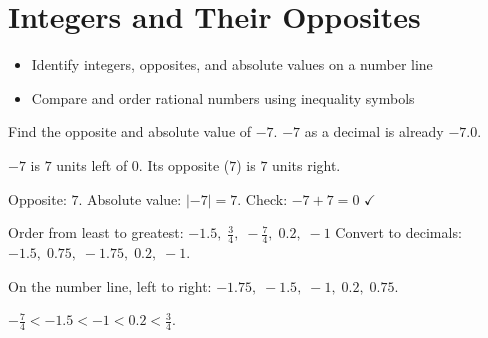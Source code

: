 \section{Integers and Their Opposites}

\begin{stepGoal}
\begin{itemize}
    \item Identify integers, opposites, and absolute values on a number line
    \item Compare and order rational numbers using inequality symbols
\end{itemize}
\end{stepGoal}

\begin{stepVocabBox}
\end{stepVocabBox}

\begin{stepsCard}
\end{stepsCard}

\begin{stepExample}{Find the opposite and absolute value of $-7$.}
     $-7$ as a decimal is already $-7.0$.

     $-7$ is $7$ units left of $0$. Its opposite ($7$) is $7$ units right.

     Opposite: $7$. Absolute value: $|-7| = 7$. Check: $-7 + 7 = 0$ $\checkmark$
\end{stepExample}

\begin{stepExample}{Order from least to greatest: $-1.5, \;\frac{3}{4}, \;-\frac{7}{4}, \;0.2, \;-1$}
     Convert to decimals: $-1.5, \;0.75, \;-1.75, \;0.2, \;-1$.

     On the number line, left to right: $-1.75, \;-1.5, \;-1, \;0.2, \;0.75$.

     $-\frac{7}{4} < -1.5 < -1 < 0.2 < \frac{3}{4}$.
\end{stepExample}

